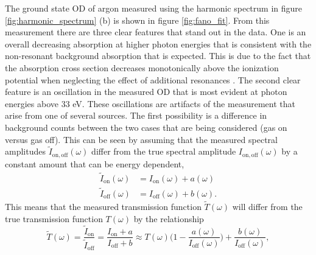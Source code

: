 The ground state OD of argon measured using the harmonic spectrum in figure \ref{fig:harmonic_spectrum} (b) is shown in figure \ref{fig:fano_fit}.  From this measurement there are three clear features that stand out in the data.  One is an overall decreasing absorption at higher photon energies that is consistent with the non-resonant background absorption that is expected.  This is due to the fact that the absorption cross section decreases monotonically above the ionization potential when neglecting the effect of additional resonances \cite{henkeXRayInteractionsPhotoabsorption1993, sorensenArgon3sAutoionization1994, ogurtsovAutoIonizationStatesArgon1970}.  The second clear feature is an oscillation in the measured OD that is most evident at photon energies above 33 eV.  These oscillations are artifacts of the measurement that arise from one of several sources.  The first possibility is a difference in background counts between the two cases that are being considered (gas on versus gas off).  This can be seen by assuming that the measured spectral amplitudes $\tilde{I}_{\mathrm{on,off}}(\omega)$ differ from the true spectral amplitude  $I_{\mathrm{on,off}}(\omega)$ by a constant amount that can be energy dependent,
\begin{equation}
\label{eqn:measured_approx}
	\begin{aligned}
	\tilde{I}_{\mathrm{on}}(\omega) &= I_{\mathrm{on}}(\omega) + a(\omega) \\
	\tilde{I}_{\mathrm{off}}(\omega) &= I_{\mathrm{off}}(\omega) + b(\omega).
	\end{aligned}
\end{equation}
This means that the measured transmission function $\tilde{T}(\omega)$ will differ from the true transmission function $T(\omega)$ by the relationship
\begin{equation}
	\tilde{T}(\omega) = \frac{\tilde{I}_{\mathrm{on}}}{\tilde{I}_{\mathrm{off}}} = \frac{I_{\mathrm{on}} + a}{I_{\mathrm{off}} + b} \approx T(\omega)\bigg(1 - \frac{a(\omega)}{I_{\mathrm{off}}(\omega)}\bigg) + \frac{b(\omega)}{I_{\mathrm{off}}(\omega)},
\end{equation}
